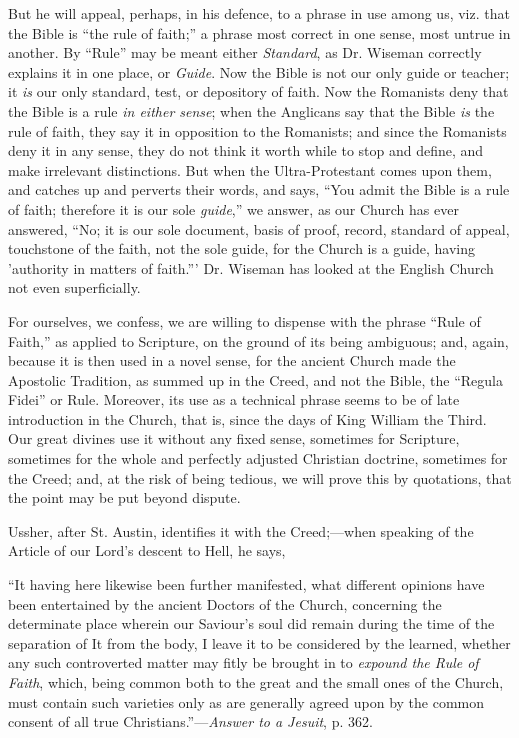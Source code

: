 But he will
appeal, perhaps, in his defence, to a phrase in use among us, viz. that
the Bible is ``the rule of faith;'' a phrase most correct in one
sense, most untrue in another. By ``Rule'' may be meant either \emph{Standard},
as Dr. Wiseman correctly explains it in one place, or \emph{Guide}. Now
the Bible is not our only guide or teacher; it \emph{is} our only
standard, test, or depository of faith. Now the Romanists deny that the
Bible is a rule \emph{in either sense}; when the Anglicans say that the
Bible \emph{is} the rule of faith, they say it in opposition to the
Romanists; and since the Romanists deny it in any sense, they do not
think it worth while to stop and define, and make irrelevant
distinctions. But when the Ultra-Protestant comes upon them, and catches
up and perverts their words, and says, ``You admit the Bible is a rule
of faith; therefore it is our sole \emph{guide},'' we answer, as our
Church has ever answered, ``No; it is our sole document, basis of
proof, record, standard of appeal, touchstone of the faith, not the sole
guide, for the Church is a guide, having 'authority in matters of
faith.''' Dr. Wiseman has looked at the English Church not even
superficially.

For
ourselves, we confess, we are willing to dispense with the phrase ``Rule of Faith,'' as applied to Scripture, on the ground of its being
ambiguous; and, again, because it is then used in a novel sense, for the
ancient Church made the Apostolic Tradition, as summed up in the Creed,
and not the Bible, the ``Regula Fidei'' or Rule. Moreover, its use as
a technical phrase seems to be of late introduction in the Church, that
is, since the days of King William the Third. Our great divines use it
without any fixed sense, sometimes for Scripture, sometimes for the
whole and perfectly adjusted Christian doctrine, sometimes for the
Creed; and, at the risk of being tedious, we will prove this by
quotations, that the point may be put beyond dispute.

Ussher,
after St. Austin, identifies it with the Creed;—when speaking of the
Article of our Lord's descent to Hell, he says,

``It
having here likewise been further manifested, what different opinions
have been entertained by the ancient Doctors of the Church, concerning
the determinate place wherein our Saviour's soul did remain during the
time of the separation of It from the body, I leave it to be considered
by the learned, whether any such controverted matter may fitly be
brought in to \emph{expound the Rule of Faith}, which, being common both
to the great and the small ones of the Church, must contain such
varieties only as are generally agreed upon by the common consent of all
true Christians.''—\emph{Answer to a Jesuit}, p. 362.

